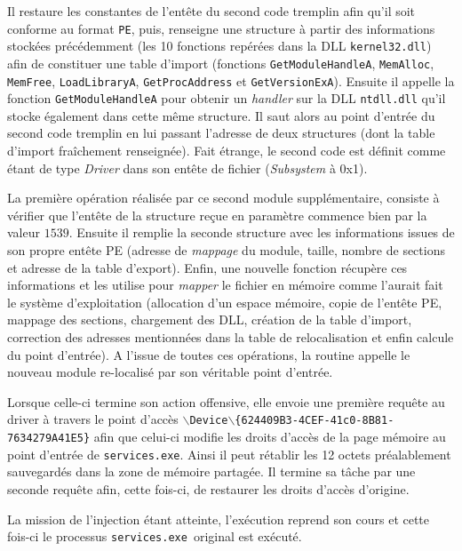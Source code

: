\documentclass[times,11pt,fullpage]{article}
\newcommand{\service}{\texttt{services.exe}}
\begin{document}
Il restaure les constantes de l'entête du second code tremplin afin qu'il soit conforme au format \texttt{PE}, puis, renseigne une structure à partir des informations stockées précédemment (les 10 fonctions repérées dans la DLL \texttt{kernel32.dll}) afin de constituer une table d'import (fonctions \texttt{GetModuleHandleA}, \texttt{MemAlloc}, \texttt{MemFree}, \texttt{LoadLibraryA}, \texttt{GetProcAddress} et \texttt{GetVersionExA}). Ensuite il appelle la fonction \texttt{GetModuleHandleA} pour obtenir un \emph{handler} sur la DLL  \texttt{ntdll.dll} qu'il stocke également dans cette même structure. Il saut alors au point d'entrée du second code tremplin en lui passant l'adresse de deux structures (dont la table d'import fraîchement renseignée). Fait étrange, le second code est définit comme étant de type \emph{Driver} dans son entête de fichier (\emph{Subsystem} à 0x1).

La première opération réalisée par ce second module supplémentaire, consiste à vérifier que l'entête de la structure reçue en paramètre commence bien par la valeur $1539$. Ensuite il remplie la seconde structure avec les informations issues de son propre entête PE (adresse de \emph{mappage} du module, taille, nombre de sections et adresse de la table d'export). Enfin, une nouvelle fonction récupère ces informations et les utilise pour \emph{mapper} le fichier en mémoire comme l'aurait fait le système d'exploitation (allocation d'un espace mémoire, copie de l'entête PE, mappage des sections, chargement des DLL, création de la table d'import, correction des adresses mentionnées dans la table de relocalisation et enfin calcule du point d'entrée). A l'issue de toutes ces opérations, la routine appelle le nouveau module re-localisé par son véritable point d'entrée.






Lorsque celle-ci termine son action offensive, elle envoie une première requête au driver à travers le point d'accès $\backslash$\texttt{Device}$\backslash$\texttt{\{624409B3-4CEF-41c0-8B81-7634279A41E5\}} afin que celui-ci modifie les droits d'accès de la page mémoire au point d'entrée de \service. Ainsi il peut rétablir les 12 octets préalablement sauvegardés dans la zone de mémoire partagée. Il termine sa tâche par une seconde requête afin, cette fois-ci, de restaurer les droits d'accès d'origine.  


La mission de l'injection étant atteinte, l'exécution reprend son cours et cette fois-ci le processus \service\ original est exécuté.
\end{document}

